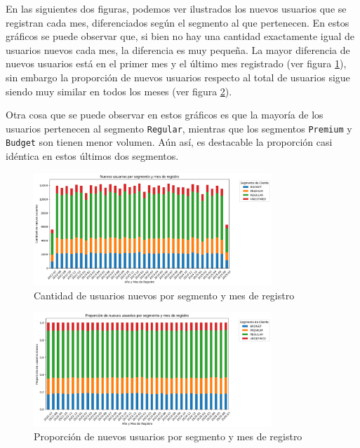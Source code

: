 En las siguientes dos figuras, podemos ver ilustrados los nuevos usuarios que se registran cada mes, diferenciados según el segmento al que pertenecen.
En estos gráficos se puede observar que, si bien no hay una cantidad exactamente igual de usuarios nuevos cada mes, la diferencia es muy pequeña. La mayor diferencia de nuevos usuarios está en el primer mes y el último mes registrado (ver figura \ref{fig:usuarios_nuevos_por_segmento_y_mes_de_registro}), sin embargo la proporción de nuevos usuarios respecto al total de usuarios sigue siendo muy similar en todos los meses (ver figura \ref{fig:proporcion_de_nuevos_usuarios}).

Otra cosa que se puede observar en estos gráficos es que la mayoría de los usuarios pertenecen al segmento \texttt{Regular}, mientras que los segmentos \texttt{Premium} y \texttt{Budget} son tienen menor volumen. Aún así, es destacable la proporción casi idéntica en estos últimos dos segmentos.

\begin{figure}[H]
    \centering
    \includegraphics[width=0.8\textwidth]{imagenes/datos_uniformes/usuarios_nuevos_por_segmento_y_mes_de_registro.png}
    \caption{Cantidad de usuarios nuevos por segmento y mes de registro}
    \label{fig:usuarios_nuevos_por_segmento_y_mes_de_registro}
\end{figure}
\begin{figure}[H]
    \centering
    \includegraphics[width=0.8\textwidth]{imagenes/datos_uniformes/proporcion_de_nuevos_usuarios.png}
    \caption{Proporción de nuevos usuarios por segmento y mes de registro}
    \label{fig:proporcion_de_nuevos_usuarios}
\end{figure}

